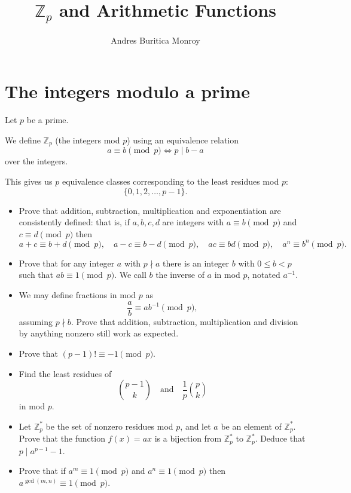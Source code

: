 \documentclass{article}
\title{$\mathbb Z_p$ and Arithmetic Functions}
\author{Andres Buritica Monroy}
\date{}
\begin{document}
\maketitle
\section{The integers modulo a prime}
Let $p$ be a prime.

We define $\mathbb Z_p$ (the integers mod $p$) using an equivalence relation
\[a\equiv b\pmod p\iff p\mid b-a\]
over the integers.

This gives us $p$ equivalence classes corresponding to the least residues mod
$p$: \[\{0,1,2,\ldots,p-1\}.\]
\begin{itemize}
	\item Prove that addition, subtraction, multiplication and exponentiation
	      are consistently defined: that
	      is, if $a,b,c,d$ are integers with $a\equiv b\pmod p$ and $c\equiv d\pmod
		      p$ then \[a+c\equiv b+d\pmod p,\quad a-c\equiv b-d\pmod p,\quad ac\equiv
		      bd\pmod p,\quad a^n\equiv b^n\pmod p.\]
	\item Prove that for any integer $a$ with $p\nmid a$ there is an integer $b$
	      with $0\le b<p$ such that $ab\equiv 1\pmod p$. We call $b$ the inverse of
	      $a$ in mod $p$, notated $a^{-1}$.
	\item We may define fractions in mod $p$ as \[\frac ab\equiv ab^{-1}\pmod p,\]
	      assuming $p\nmid b$. Prove that addition, subtraction, multiplication
	      and division by anything nonzero still work as expected.
	\item Prove that $(p-1)!\equiv -1\pmod p$.
	\item Find the least residues of
	      \[\binom {p-1}k\quad\text{and}\quad\frac1p\binom pk\] in mod $p$.
	\item Let $\mathbb Z_p^*$ be the set of nonzero residues mod $p$, and let $a$ be an
	      element of $\mathbb Z_p^*$. Prove that the function $f(x)=ax$ is a
	      bijection from $\mathbb Z_p^*$ to $\mathbb Z_p^*$. Deduce that $p\mid
		      a^{p-1}-1$.
	\item Prove that if $a^m\equiv 1\pmod p$ and $a^n\equiv 1\pmod p$ then
	      $a^{\gcd(m,n)}\equiv 1\pmod p$.
\end{itemize}
\newpage
\end{document}
